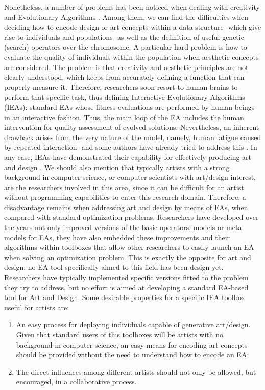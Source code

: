 \documentclass{llncs}
\begin{document}
Nonetheless, a number of problems has been noticed when dealing with creativity and Evolutionary Algorithms \cite{DBLP:conf/evoW/McCormack05}.
Among them, we can find the difficulties when deciding how to encode design or art concepts within a data structure
-which give rise to individuals and populations-  as well as the definition of useful genetic (search) operators over the chromosome.
A particular hard problem is how to evaluate the quality of individuals within the population when aesthetic concepts are considered.
The problem is that creativity and aesthetic principles are not clearly understood, which keeps from accurately defining a function that can properly  measure it.  Therefore, researchers soon resort to human brains to perform that specific task, thus defining Interactive Evolutionary Algorithms (IEAs):
standard EAs whose fitness evaluations are performed by human beings in an interactive fashion.
Thus, the main loop of the EA includes the human intervention for quality assessment of evolved solutions.
Nevertheless, an inherent drawback arises from the very nature of the model, namely, human fatigue caused by repeated interaction -and some authors have already tried to address this \cite{Frade:2010:EvoGAMES}.
In any case, IEAs have demonstrated their capability for effectively producing art and design \cite{Bentley:1999:intro,Sims:1991,todd:1992}.
We should also mention that typically artists with a strong background in computer science, or computer scientists with art/design interest,
are the researchers involved in this area, since it can be difficult for an artist without programming capabilities to enter this research domain. Therefore, a disadvantage remains when addressing art and design by means of EAs, when compared with standard optimization problems.
Researchers have developed over the years not only improved versions of the basic operators, models or meta-models for EAs, they have also embedded these
improvements and their algorithms within toolboxes that allow other researchers to easily launch an EA when solving an optimization problem.
This is exactly the opposite for art and design: no EA tool specifically aimed to this field has been design yet.
Researchers have typically implemented specific versions fitted to the problem they try to address,
but no effort is aimed at developing a standard EA-based tool for Art and Design. Some desirable properties for a specific IEA 
toolbox useful for artists are:

\begin{enumerate}

	\item An easy process for deploying individuals capable of generative art/design. Given that standard users of this toolboxes will be artists with no background in computer science, an easy means for encoding art concepts should be provided,without the need to understand how to encode an EA;

	\item The direct influences among different artists should not only be allowed, but encouraged, in a collaborative process.

\end{enumerate}
\end{document}
